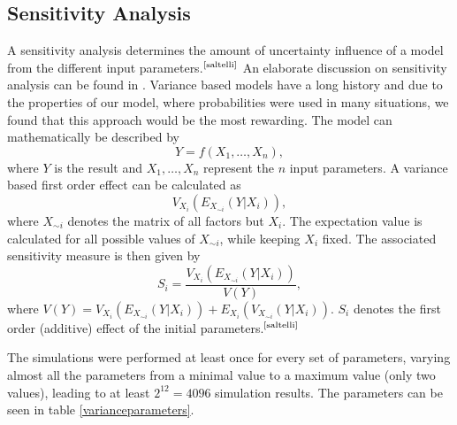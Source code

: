 \documentclass[11pt]{article}
\begin{document}
\subsection{Sensitivity Analysis}\label{sensitivityanalysis}
A sensitivity analysis determines the amount of uncertainty influence of a model from the different input parameters.$^{\text{\cite{saltelli}}}$ An elaborate discussion on sensitivity analysis can be found in \cite{saltelli}. Variance based models have a long history and due to the properties of our model, where probabilities were used in many situations, we found that this approach would be the most rewarding. The model can mathematically be described by
\begin{equation}
Y=f(X_1,\ldots, X_n),
\end{equation}
where $Y$ is the result and $X_1,\ldots,X_n$ represent the $n$ input parameters. A variance based first order effect can be calculated as
\begin{equation}
V_{X_i}(E_{X_{\sim i}}(Y|X_i)),
\end{equation}
where $X_{\sim i}$ denotes the matrix of all factors but $X_i$. The expectation value is calculated for all possible values of $X_{\sim i}$, while keeping $X_i$ fixed. The associated sensitivity measure is then given by
\begin{equation}
S_i=\frac{V_{X_i}(E_{X_{\sim i}}(Y|X_i))}{V(Y)},\label{sensitivity}
\end{equation}
where $V(Y)=V_{X_i}(E_{X_{\sim i}}(Y|X_i))+E_{X_i}(V_{X_{\sim i}}(Y|X_i))$. $S_i$ denotes the first order (additive) effect of the initial parameters.$^{\text{\cite{saltelli}}}$

The simulations were performed at least once for every set of parameters, varying almost all the parameters from a minimal value to a maximum value (only two values), leading to at least $2^{12}=4096$ simulation results. The parameters can be seen in table \ref{varianceparameters}.
\end{document}

